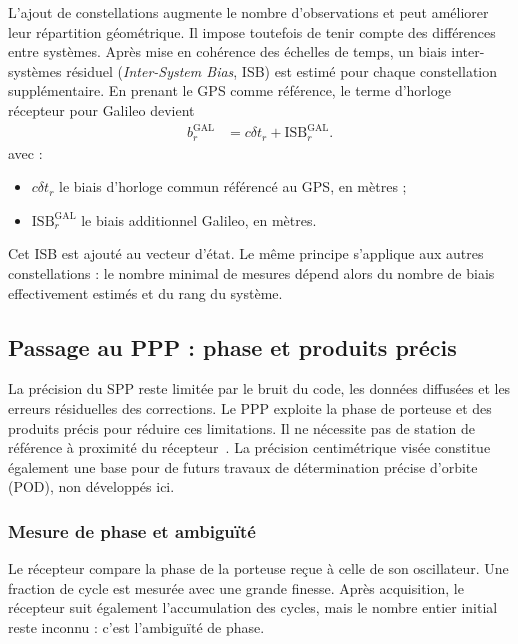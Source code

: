 L'ajout de constellations augmente le nombre d'observations et peut améliorer
leur répartition géométrique. Il impose toutefois de tenir compte des
différences entre systèmes. Après mise en cohérence des échelles de temps,
un biais inter-systèmes résiduel (\textit{Inter-System Bias}, ISB) est estimé
pour chaque constellation supplémentaire. En prenant le GPS comme référence,
le terme d'horloge récepteur pour Galileo devient
\begin{align}
b_r^{\mathrm{GAL}}&=c\delta t_r+\mathrm{ISB}_r^{\mathrm{GAL}}.
\label{new:isb}
\end{align}
avec :
\begin{itemize}
\item $c\delta t_r$ le biais d'horloge commun référencé au GPS, en mètres ;
\item $\mathrm{ISB}_r^{\mathrm{GAL}}$ le biais additionnel Galileo, en mètres.
\end{itemize}

Cet ISB est ajouté au vecteur d'état. Le même principe s'applique aux autres
constellations : le nombre minimal de mesures dépend alors du nombre de
biais effectivement estimés et du rang du système.

\subsection{Passage au PPP : phase et produits précis}

La précision du SPP reste limitée par le bruit du code, les données
diffusées et les erreurs résiduelles des corrections. Le PPP exploite la
phase de porteuse et des produits précis pour réduire ces limitations.
Il ne nécessite pas de station de référence à proximité du
récepteur~\cite{zumberge1997,koubaHeroux2001}. La précision centimétrique visée
constitue également une base pour de futurs travaux de détermination précise
d'orbite (POD), non développés ici.

\subsubsection{Mesure de phase et ambiguïté}

Le récepteur compare la phase de la porteuse reçue à celle de son oscillateur.
Une fraction de cycle est mesurée avec une grande finesse. Après acquisition,
le récepteur suit également l'accumulation des cycles, mais le nombre entier
initial reste inconnu : c'est l'ambiguïté de phase.

